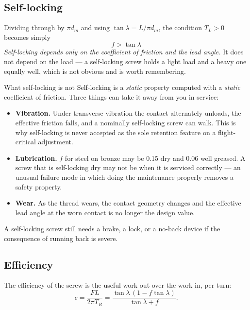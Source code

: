 \documentclass[11pt,a4paper]{article}
\begin{document}
\subsection{Self-locking}\label{sec:selflock}

Dividing through by $\pi d_m$ and using $\tan\lambda = L/\pi d_m$, the condition $T_L > 0$ becomes
simply
\[
\boxed{\,f > \tan\lambda\,}
\]
\emph{Self-locking depends only on the coefficient of friction and the lead angle.} It does not depend
on the load --- a self-locking screw holds a light load and a heavy one equally well, which is not
obvious and is worth remembering.

\begin{keybox}{What self-locking is not}
Self-locking is a \emph{static} property computed with a \emph{static} coefficient of friction. Three
things can take it away from you in service:
\begin{itemize}[nosep]
  \item \textbf{Vibration.} Under transverse vibration the contact alternately unloads, the effective
        friction falls, and a nominally self-locking screw can walk. This is why self-locking is never
        accepted as the sole retention feature on a flight-critical adjustment.
  \item \textbf{Lubrication.} $f$ for steel on bronze may be 0.15 dry and 0.06 well greased. A screw
        that is self-locking dry may not be when it is serviced correctly --- an unusual failure mode
        in which doing the maintenance properly removes a safety property.
  \item \textbf{Wear.} As the thread wears, the contact geometry changes and the effective lead angle
        at the worn contact is no longer the design value.
\end{itemize}
A self-locking screw still needs a brake, a lock, or a no-back device if the consequence of running
back is severe.
\end{keybox}

\subsection{Efficiency}

The efficiency of the screw is the useful work out over the work in, per turn:
\[
e = \frac{F L}{2\pi T_R}
= \frac{\tan\lambda\,(1 - f\tan\lambda)}{\tan\lambda + f}.
\]
\end{document}
